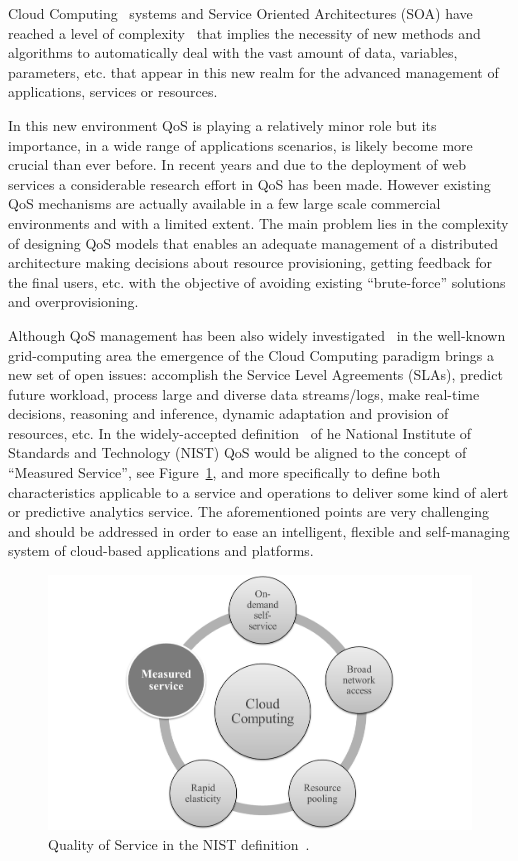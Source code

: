 Cloud Computing~\cite{mell2011nist} systems and Service Oriented Architectures (SOA) have 
reached a level of complexity~\cite{Huebscher:2008:SAC:1380584.1380585,Conejero:2012:MSQ:2357487.2357591} that implies the necessity of new methods 
and algorithms to automatically deal with the vast amount of data, variables, 
parameters, etc. that appear in this new realm for the advanced management of 
applications, services or resources. 

In this new environment QoS is playing a relatively minor role but its 
importance, in a wide range of applications scenarios, is likely become more 
crucial than ever before. In recent years and due to the deployment of web 
services a considerable research effort in QoS has been made. However existing 
QoS mechanisms are actually available in a few large scale commercial 
environments and with a limited extent. The main problem lies in the complexity 
of designing QoS models that enables an adequate management of a distributed 
architecture making decisions about resource provisioning, getting feedback for 
the final users, etc. with the objective of avoiding existing ``brute-force''
solutions and overprovisioning. 

Although QoS management has been also widely investigated~\cite{Conejero:2012:MSQ:2357487.2357591} 
in the well-known grid-computing area the emergence of the Cloud Computing paradigm 
brings a new set of open issues: accomplish the  Service Level Agreements (SLAs), predict 
future workload, process large and diverse data streams/logs, make real-time 
decisions, reasoning and inference, dynamic adaptation and provision of 
resources, etc. In the widely-accepted definition~\cite{mell2011nist} of 
he National Institute of Standards and Technology (NIST) QoS 
would be aligned to the concept of ``Measured Service'', see Figure~\ref{fig:qos-intro}, and 
more specifically to define both characteristics applicable to a service and operations 
to deliver some kind of alert or predictive analytics service. 
The aforementioned points are very challenging and should be 
addressed in order to ease an intelligent, flexible and self-managing system of 
cloud-based applications and platforms.


 \begin{figure}[!ht]
\centering
	\includegraphics[width=12cm]{./imgs/qos-intro}
 \caption{Quality of Service in the NIST definition~\cite{mell2011nist}.}
 \label{fig:qos-intro}
\end{figure}

